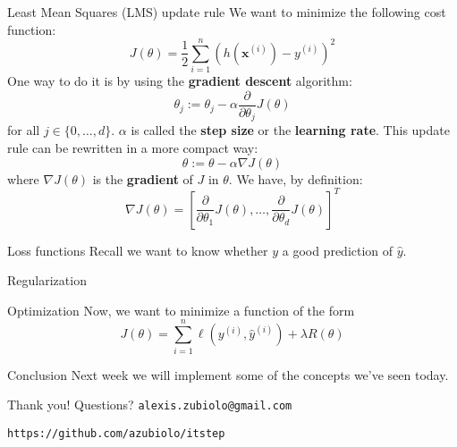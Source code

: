 \documentclass{beamer}
\newcommand{\yhat}{\hat{y}}
\newcommand{\bxi}{\bm{x}^{(i)}}
\newcommand{\yi}{y^{(i)}}
\newcommand{\yhati}{\hat{y}^{(i)}}
\begin{document}
\begin{frame}{Least Mean Squares (LMS) update rule}
We want to minimize the following cost function:
\begin{equation*}
J(\theta) = \dfrac{1}{2} \sum_{i = 1}^{n} \left( h\left(\bxi\right) - \yi \right)^2
\end{equation*}
One way to do it is by using the \textbf{gradient descent} algorithm:
\begin{equation*}
\theta_j := \theta_j - \alpha \dfrac{\partial}{\partial \theta_j} J(\theta)
\end{equation*}
for all $j \in \{ 0, \dots, d\}$. $\alpha$ is called the \textbf{step size} or the \textbf{learning rate}. This update rule can be rewritten in a more compact way:
\begin{equation*}
\theta := \theta - \alpha \nabla J(\theta)
\end{equation*}
where $\nabla J(\theta)$ is the \textbf{gradient} of $J$ in $\theta$. We have, by definition:
\begin{equation*}
\nabla J(\theta) = \left[ \dfrac{\partial}{\partial \theta_1} J(\theta), \dots, \dfrac{\partial}{\partial \theta_d} J(\theta) \right]^T
\end{equation*}
\end{frame}

\begin{frame}{Loss functions}
Recall we want to know whether $y$ a good prediction of $\yhat$.
\end{frame}

\begin{frame}{Regularization}

\end{frame}

\begin{frame}{Optimization}
Now, we want to minimize a function of the form
\begin{equation}
J(\theta) = \sum_{i = 1}^{n} \ell\left(\yi, \yhati\right) + \lambda R(\theta)
\end{equation}
\end{frame}

\begin{frame}{Conclusion}
Next week we will implement some of the concepts we've seen today.
\end{frame}

\begin{frame}
\vfill
\centering
\begin{huge}
\huge{Thank you! Questions?}
\vfill
\texttt{alexis.zubiolo@gmail.com}
\end{huge}
\vfill
\begin{Large}
\texttt{https://github.com/azubiolo/itstep}
\end{Large}
\vfill
\end{frame}
\end{document}
